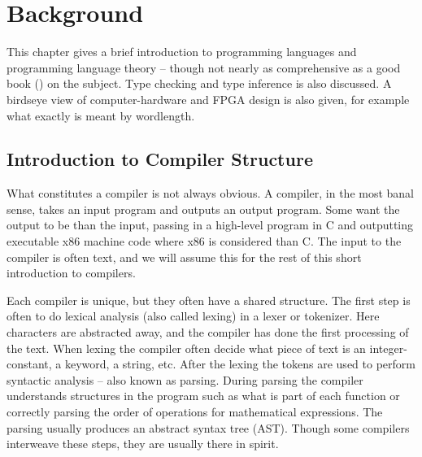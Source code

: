 \chapter{Background}
\label{chaBackground}
This chapter gives a brief introduction to programming languages and programming language theory -- though not nearly as comprehensive as a good book (\cite{src:DragonBook, src:CraftingInterp}) on the subject. Type checking and type inference is also discussed. A birdseye view of computer-hardware and FPGA design is also given, for example what exactly is meant by wordlength.

% 

\section{Introduction to Compiler Structure}
What constitutes a compiler is not always obvious. A compiler, in the most banal sense, takes an input program and outputs an output program. Some want the output to be  than the input, passing in a high-level program in C and outputting executable x86 machine code where x86 is considered  than C. The input to the compiler is often text, and we will assume this for the rest of this short introduction to compilers.

Each compiler is unique, but they often have a shared structure. The first step is often to do lexical analysis (also called lexing) in a lexer or tokenizer. Here characters are abstracted away, and the compiler has done the first processing of the text. When lexing the compiler often decide what piece of text is an integer-constant, a keyword, a string, etc. After the lexing the tokens are used to perform syntactic analysis -- also known as parsing. During parsing the compiler understands structures in the program such as what is part of each function or correctly parsing the order of operations for mathematical expressions. The parsing usually produces an abstract syntax tree (AST). Though some compilers interweave these steps, they are usually there in spirit.

